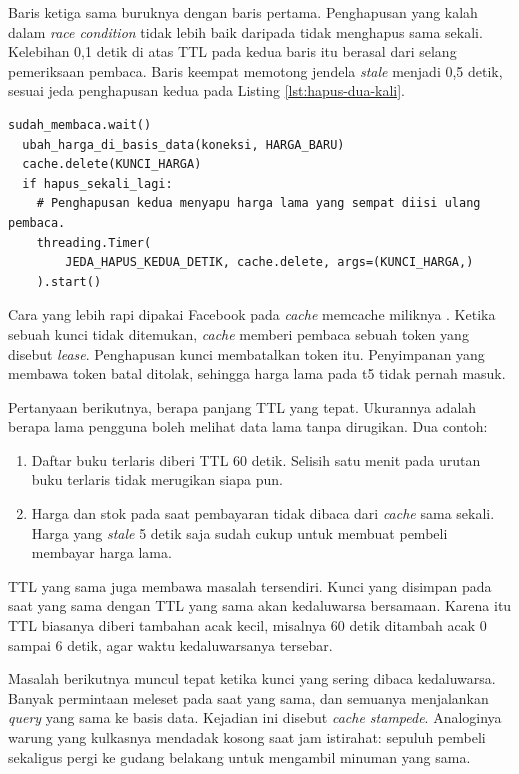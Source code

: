 Baris ketiga sama buruknya dengan baris pertama. Penghapusan yang kalah dalam \textit{race condition}
tidak lebih baik daripada tidak menghapus sama sekali. Kelebihan 0,1 detik di
atas TTL pada kedua baris itu berasal dari selang pemeriksaan pembaca. Baris
keempat memotong jendela \textit{stale} menjadi 0,5 detik, sesuai jeda penghapusan kedua
pada Listing \ref{lst:hapus-dua-kali}.

\begin{lstlisting}[style=PythonStyle, caption={Penghapusan kedua yang menyapu harga lama, tersedia di \berkas{sources/chapter04/invalidasi.py}}, label={lst:hapus-dua-kali}]
  sudah_membaca.wait()
  ubah_harga_di_basis_data(koneksi, HARGA_BARU)
  cache.delete(KUNCI_HARGA)
  if hapus_sekali_lagi:
    # Penghapusan kedua menyapu harga lama yang sempat diisi ulang pembaca.
    threading.Timer(
        JEDA_HAPUS_KEDUA_DETIK, cache.delete, args=(KUNCI_HARGA,)
    ).start()
\end{lstlisting}

Cara yang lebih rapi dipakai Facebook pada \textit{cache} memcache miliknya
\cite{nishtala2013memcache}. Ketika sebuah kunci tidak ditemukan,
\textit{cache} memberi pembaca sebuah token yang disebut \textit{lease}.
Penghapusan kunci membatalkan token itu. Penyimpanan yang membawa token batal
ditolak, sehingga harga lama pada t5 tidak pernah masuk.

Pertanyaan berikutnya, berapa panjang TTL yang tepat. Ukurannya adalah berapa
lama pengguna boleh melihat data lama tanpa dirugikan. Dua contoh:

\begin{enumerate}
  \item Daftar buku terlaris diberi TTL 60 detik. Selisih satu menit pada
        urutan buku terlaris tidak merugikan siapa pun.
  \item Harga dan stok pada saat pembayaran tidak dibaca dari \textit{cache}
        sama sekali. Harga yang \textit{stale} 5 detik saja sudah cukup untuk membuat
        pembeli membayar harga lama.
\end{enumerate}

TTL yang sama juga membawa masalah tersendiri. Kunci yang disimpan pada saat
yang sama dengan TTL yang sama akan kedaluwarsa bersamaan. Karena itu TTL
biasanya diberi tambahan acak kecil, misalnya 60 detik ditambah acak 0 sampai
6 detik, agar waktu kedaluwarsanya tersebar.

Masalah berikutnya muncul tepat ketika kunci yang sering dibaca kedaluwarsa.
Banyak permintaan meleset pada saat yang sama, dan semuanya menjalankan \textit{query}
yang sama ke basis data. Kejadian ini disebut \textit{cache stampede}.
Analoginya warung yang kulkasnya mendadak kosong saat jam istirahat: sepuluh
pembeli sekaligus pergi ke gudang belakang untuk mengambil minuman yang sama.

